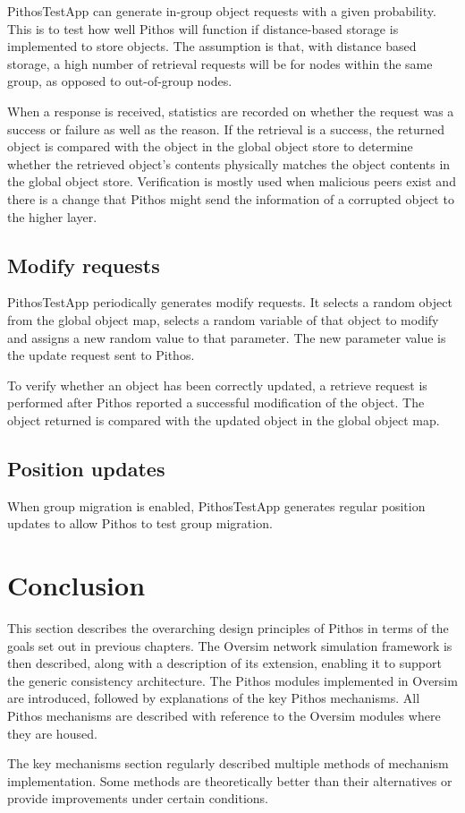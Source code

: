 PithosTestApp can generate in-group object requests with a given probability. This is to test how well Pithos will function if distance-based storage is implemented to store objects. The assumption is that, with distance based storage, a high number of retrieval requests will be for nodes within the same group, as opposed to out-of-group nodes.

When a response is received, statistics are recorded on whether the request was a success or failure as well as the reason. If the retrieval is a success, the returned object is compared with the object in the global object store to determine whether the retrieved object's contents physically matches the object contents in the global object store. Verification is mostly used when malicious peers exist and there is a change that Pithos might send the information of a corrupted object to the higher layer.

\subsection{Modify requests}

PithosTestApp periodically generates modify requests. It selects a random object from the global object map, selects a random variable of that object to modify and assigns a new random value to that parameter. The new parameter value is the update request sent to Pithos.

To verify whether an object has been correctly updated, a retrieve request is performed after Pithos reported a successful modification of the object. The object returned is compared with the updated object in the global object map.

\subsection{Position updates}

When group migration is enabled, PithosTestApp generates regular position updates to allow Pithos to test group migration.

\section{Conclusion}

This section describes the overarching design principles of Pithos in terms of the goals set out in previous chapters. The Oversim network simulation framework is then described, along with a description of its extension, enabling it to support the generic consistency architecture. The Pithos modules implemented in Oversim are introduced, followed by explanations of the key Pithos mechanisms. All Pithos mechanisms are described with reference to the Oversim modules where they are housed.

The key mechanisms section regularly described multiple methods of mechanism implementation. Some methods are theoretically better than their alternatives or provide improvements under certain conditions.
